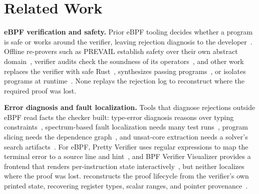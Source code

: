 \section{Related Work}\label{sec:related-work}

\noindent\textbf{eBPF verification and safety.}
Prior eBPF tooling decides whether a program is safe or works around the verifier, leaving rejection diagnosis to the developer~\cite{deokar2024empirical}.
Offline re-provers such as PREVAIL establish safety over their own abstract domain~\cite{gershuni2019simple}, verifier audits check the soundness of its operators~\cite{vishwanathan2023verifying, vishwanathan2022sound, sun2024validating}, and other work replaces the verifier with safe Rust~\cite{jia2025rex}, synthesizes passing programs~\cite{zheng2024kgent}, or isolates programs at runtime~\cite{lu2024moat, zhang2024hive, lim2023unleashing, lim2024safebpf}.
None replays the rejection log to reconstruct where the required proof was lost.

\noindent\textbf{Error diagnosis and fault localization.}
Tools that diagnose rejections outside eBPF read facts the checker built: type-error diagnosis reasons over typing constraints~\cite{pavlinovic2014finding, zhang2014toward, seidel2017learning}, spectrum-based fault localization needs many test runs~\cite{wong2016survey, jones2005empirical}, program slicing needs the dependence graph~\cite{weiser1981program}, and unsat-core extraction needs a solver's search artifacts~\cite{cimatti2011computing}.
For eBPF, Pretty Verifier uses regular expressions to map the terminal error to a source line and hint~\cite{rizza2025design}, and BPF Verifier Visualizer provides a frontend that renders per-instruction state interactively~\cite{bpfvv}, but neither localizes where the proof was lost.
\sys reconstructs the proof lifecycle from the verifier's own printed state, recovering register types, scalar ranges, and pointer provenance~\cite{linuxkernel-bpf-verifier}.
